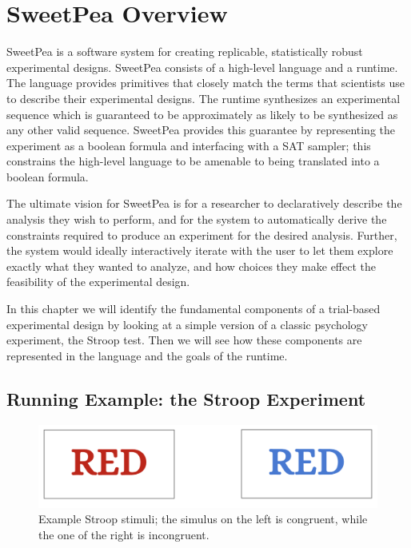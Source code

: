 
\chapter{SweetPea Overview}

SweetPea is a software system for creating replicable, statistically robust experimental designs. SweetPea consists of a high-level language and a runtime. The language provides primitives that closely match the terms that scientists use to describe their experimental designs. The runtime synthesizes an experimental sequence which is guaranteed to be approximately as likely to be synthesized as any other valid sequence. SweetPea provides this guarantee by representing the experiment as a boolean formula and interfacing with a SAT sampler; this constrains the high-level language to be amenable to being translated into a boolean formula.

The ultimate vision for SweetPea is for a researcher to declaratively describe the analysis they wish to perform, and for the system to automatically derive the constraints required to produce an experiment for the desired analysis. Further, the system would ideally interactively iterate with the user to let them explore exactly what they wanted to analyze, and how choices they make effect the feasibility of the experimental design.

In this chapter we will identify the fundamental components of a trial-based experimental design by looking at a simple version of a classic psychology experiment, the Stroop test. Then we will see how these components are represented in the language and the goals of the runtime.

\section{Running Example: the Stroop Experiment}

\begin{figure}[t]%
    \centering
    \centerline{\includegraphics[origin=c,width=12cm]{fig_red_and_blue}}
    \caption{Example Stroop stimuli; the simulus on the left is congruent, while the one of the right is incongruent.}%
    \label{fig:stroop_example}%
\end{figure}

